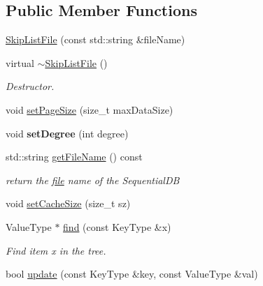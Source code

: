 \subsection*{Public Member Functions}
\begin{CompactItemize}
\item 
\hyperlink{classSkipListFile_7be7790d5ea16f3261db01afb62b55e1}{SkipListFile} (const std::string \&fileName)
\item 
virtual \hyperlink{classSkipListFile_d233c08a7814bff2e1e535de1414f799}{$\sim$SkipListFile} ()
\begin{CompactList}\small\item\em Destructor. \item\end{CompactList}\item 
void \hyperlink{classSkipListFile_b8a6cbf9fb0386dd4eb965b2aad18f53}{setPageSize} (size\_\-t maxDataSize)
\item 
\hypertarget{classSkipListFile_940d6fda21e881c4fed93dc91a44ba97}{
void \textbf{setDegree} (int degree)}
\label{classSkipListFile_940d6fda21e881c4fed93dc91a44ba97}

\item 
\hypertarget{classSkipListFile_4cb6941e68b83ee403da711596320f19}{
std::string \hyperlink{classSkipListFile_4cb6941e68b83ee403da711596320f19}{getFileName} () const }
\label{classSkipListFile_4cb6941e68b83ee403da711596320f19}

\begin{CompactList}\small\item\em return the \hyperlink{classfile}{file} name of the SequentialDB \item\end{CompactList}\item 
void \hyperlink{classSkipListFile_33f3d7ea02a004d7fdedffe582f2ea72}{setCacheSize} (size\_\-t sz)
\item 
ValueType $\ast$ \hyperlink{classSkipListFile_d5991f6c784169c5cf582d9700eb7d78}{find} (const KeyType \&x)
\begin{CompactList}\small\item\em Find item x in the tree. \item\end{CompactList}\item 
\hypertarget{classSkipListFile_02c3a0a04f7dfa5951d79bf31c6a68a1}{
bool \hyperlink{classSkipListFile_02c3a0a04f7dfa5951d79bf31c6a68a1}{update} (const KeyType \&key, const ValueType \&val)}
\label{classSkipListFile_02c3a0a04f7dfa5951d79bf31c6a68a1}


\end{CompactItemize}
